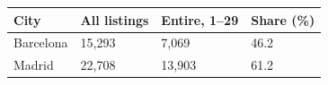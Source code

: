 \begin{tabular}{llll}
\toprule
City & All listings & Entire, 1--29 & Share (\%) \\
\midrule
Barcelona & 15,293 & 7,069 & 46.2 \\
Madrid & 22,708 & 13,903 & 61.2 \\
\bottomrule
\end{tabular}
